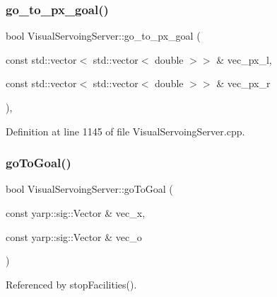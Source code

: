 \subsubsection{\texorpdfstring{go\+\_\+to\+\_\+px\+\_\+goal()}{go\_to\_px\_goal()}\hspace{0.1cm}{\footnotesize\ttfamily [2/2]}}
{\footnotesize\ttfamily bool Visual\+Servoing\+Server\+::go\+\_\+to\+\_\+px\+\_\+goal (\begin{DoxyParamCaption}\item[{const std\+::vector$<$ std\+::vector$<$ double $>$$>$ \&}]{vec\+\_\+px\+\_\+l,  }\item[{const std\+::vector$<$ std\+::vector$<$ double $>$$>$ \&}]{vec\+\_\+px\+\_\+r }\end{DoxyParamCaption})\hspace{0.3cm}{\ttfamily [override]}, {\ttfamily [protected]}}



Definition at line 1145 of file Visual\+Servoing\+Server.\+cpp.

\mbox{\label{classVisualServoingServer_a085bb298e50f295d670bff6e4cb808d8}} 
\subsubsection{\texorpdfstring{go\+To\+Goal()}{goToGoal()}\hspace{0.1cm}{\footnotesize\ttfamily [1/2]}}
{\footnotesize\ttfamily bool Visual\+Servoing\+Server\+::go\+To\+Goal (\begin{DoxyParamCaption}\item[{const yarp\+::sig\+::\+Vector \&}]{vec\+\_\+x,  }\item[{const yarp\+::sig\+::\+Vector \&}]{vec\+\_\+o }\end{DoxyParamCaption})\hspace{0.3cm}{\ttfamily [override]}}



Referenced by stop\+Facilities().

\mbox{\label{classVisualServoingServer_a40ab9e9804793a58243077f31a2d79a4}} 
